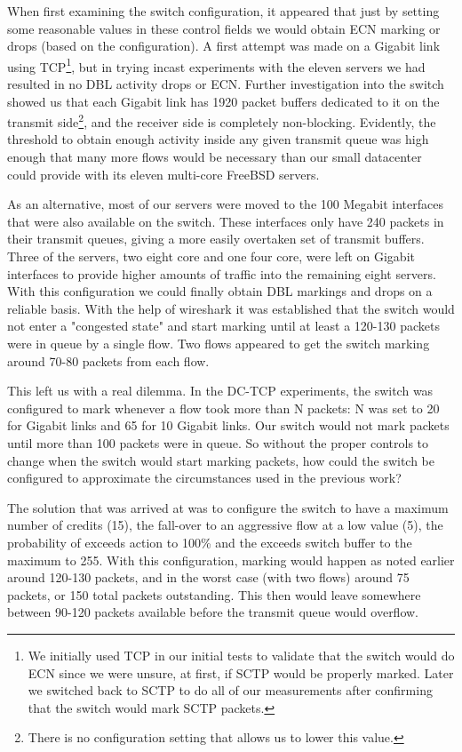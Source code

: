 \documentclass[12pt]{article}
\begin{document}
 When first examining the switch configuration, it appeared that just by setting some reasonable values in these
 control fields we would obtain ECN marking or drops (based on the configuration). A first attempt was made on a Gigabit
 link using TCP\footnote{We initially used TCP in our initial tests to validate that the switch would do ECN since
 we were unsure, at first, if SCTP would be properly marked. Later we switched back to SCTP to do all of our measurements
 after confirming that the switch would mark SCTP packets.},
 but in trying incast experiments with the eleven servers we had resulted in no DBL  
 activity drops or ECN. Further investigation into the switch showed us that each Gigabit link has 1920 packet
 buffers dedicated to it on the transmit side\footnote{There is no configuration setting that allows us
 to lower this value.}, and the receiver side is completely non-blocking. Evidently, the
 threshold to obtain enough activity inside any given transmit queue was high enough that many more
 flows would be necessary than our small datacenter could provide with its eleven multi-core FreeBSD servers. 
 
 As an alternative, most of our servers were moved to the 100 Megabit interfaces that were also available
 on the switch. These interfaces only have 240 packets in their transmit queues, giving a more easily
 overtaken set of transmit buffers. Three of the servers,
 two eight core and one four core, were left on Gigabit interfaces to provide higher amounts of traffic
 into the remaining eight servers. With this configuration we could finally obtain DBL markings and drops
 on a reliable basis. With the help of wireshark it was established that the switch would not
 enter a "congested state" and start marking until at least a 120-130 packets were in queue by a single
 flow. Two flows appeared to get the switch marking around 70-80 packets from each flow.
 
 This left us with a real dilemma. In the DC-TCP experiments, the switch was configured to mark
 whenever a flow took more than N packets:  N was set to 20 for Gigabit links and 65 for
 10 Gigabit links. Our switch would not mark packets until more than 100 packets were in queue. So
 without the proper controls to change when the switch would start marking packets,  how could the switch 
 be configured to approximate the circumstances used in the previous work?
 
 The solution that was arrived at was to configure the switch to have a maximum number
 of credits (15), the fall-over to an aggressive flow at a low value (5), the probability
 of exceeds action to 100\% and the exceeds switch buffer to the maximum to 255. With
 this configuration, marking would happen as noted earlier around 120-130 packets, and
 in the worst case (with two flows) around 75 packets, or 150 total packets outstanding. This then
 would leave somewhere between 90-120 packets available before the transmit queue would overflow.
 
\end{document}
